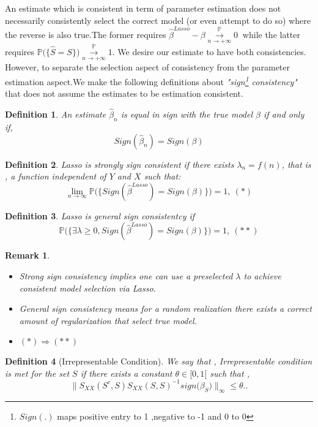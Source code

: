 \documentclass[12pt]{report}
\newtheorem {definition}{Definition}[section] %
\newtheorem{remarque}{Remark}[section]
\begin{document}
An estimate which is consistent in term of parameter estimation does not necessarily consistently select the correct model (or even attempt to do so) where the reverse is also true.The former requires $ \hat{\beta}^{Lasso}-\beta \overset{\mathbb{P}}{\underset{n\rightarrow +\infty}{\longrightarrow}}0\ $ while the latter requires $\mathbb{P}\big(\{\hat{S}=S\}\big)\overset{\mathbb{P}}{\underset{n\rightarrow +\infty}{\longrightarrow}}1$. We desire our estimate to have both consistencies. However, to separate the selection aspect of consistency from the parameter estimation aspect.We make the following definitions about \textit{"sign\footnote{$Sign(.)$ maps positive entry to 1 ,negative to -1 and 0 to 0 } consistency"} that does not assume the estimates to be estimation consistent.
\begin{definition}
	An estimate $\hat{\beta}_{n}$ is equal in sign with the true model $\beta$ if and only if,
	$$Sign(\hat{\beta}_{n})=Sign(\beta)$$
\end{definition}
\begin{definition}
	Lasso is strongly sign consistent if there exists $\lambda_{n}=f(n)$, that is , a function  independent of $Y$ and $X$ such that: 
	$$\lim_{n \rightarrow \infty}\mathbb{P}\big(\{ Sign(\hat{\beta}^{Lasso})=Sign(\beta)\}\big)=1,\ (\ast )$$
\end{definition}
\begin{definition}
	Lasso is general sign consistentcy if 
	$$\mathbb{P}\big(\{\exists\lambda \geq 0,Sign(\hat{\beta}^{Lasso})=Sign(\beta) \}\big)=1,\ (\ast \ast)$$
\end{definition}

\begin{remarque}
	\begin{itemize}
		\item Strong sign consistency implies one can use a preselected $\lambda$ to achieve consistent model selection via Lasso.
		\item General sign consistency means for a random realization there exists a correct amount of regularization that select true model.
		\item $(\ast) \Rightarrow (\ast \ast)$
	\end{itemize}
\end{remarque}
\begin{definition}[Irrepresentable Condition]
	We say that , Irrepresentable condition is met for the set $S$ if there exists a constant $\theta \in [0,1[$ such that ,
	\begin{equation}
		\parallel S_{XX}(S^{c},S)S_{XX}(S,S)^{-1}sign\big(\beta_{S}\big)\parallel_{\infty}\leq \theta.
		\label{f40}.
	\end{equation}
\end{definition}
\end{document}
